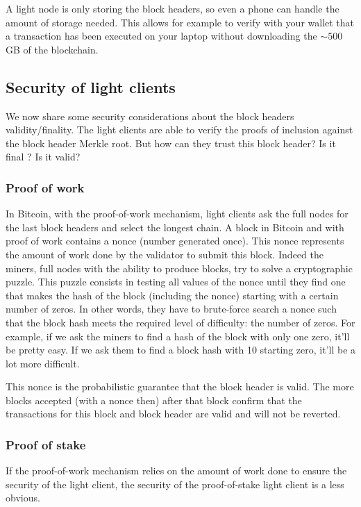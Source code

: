 A light node is only storing the block headers, so even a phone can handle the amount of storage needed. This allows for example to verify with your wallet that a transaction has been executed  on your laptop without downloading the $\sim 500$GB of the blockchain.


\subsection{Security of light clients}
\label{background:security}
We now share some security considerations about the block headers validity/finality. The light clients are able to verify the proofs of inclusion against the block header Merkle root. But how can they trust this block header? Is it final ? Is it valid? 

\subsubsection{Proof of work}
In Bitcoin, with the proof-of-work mechanism, light clients ask the full nodes for the last block headers and select the longest chain. 
A block in Bitcoin and with proof of work contains a nonce (number generated once). This nonce represents the amount of work done by the validator to submit this block. 
Indeed the miners, full nodes with the ability to produce blocks, try to solve a cryptographic puzzle. This puzzle consists in testing all values of the nonce until they find one that makes the hash of the block (including the nonce) starting with a certain number of zeros. 
In other words, they have to brute-force search a nonce such that the block hash meets the required level of difficulty: the number of zeros. 
For example, if we ask the miners to find a hash of the block with only one zero, it'll be pretty easy. If we ask them to find a block hash with 10 starting zero, it'll be a lot more difficult. 

This nonce is the probabilistic guarantee that the block header is valid. The more blocks accepted (with a nonce then) after that block confirm that the transactions for this block and block header are valid and will not be reverted.

\subsubsection{Proof of stake}
\label{securitylc:pos}
If the proof-of-work mechanism relies on the amount of work done to ensure the security of the light client, the security of the proof-of-stake light client is a less obvious. 

